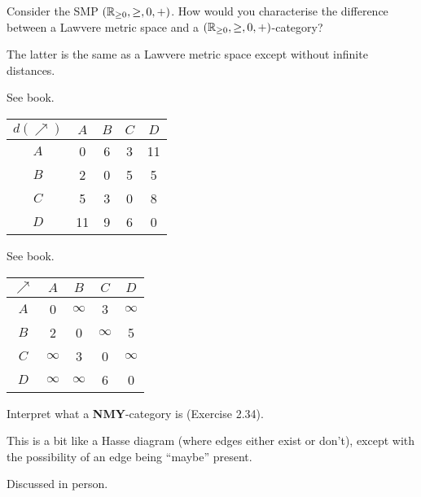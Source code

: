Consider the SMP $(\mathbb{R}_{\geq0},\geq,0,+)$.  How would you characterise the difference between a Lawvere metric space and a $(\mathbb{R}_{\geq0},\geq,0,+)$-category?

\solution
The latter is the same as a Lawvere metric space except without infinite distances.

See book.

\solution
\begin{tabular}{c|cccc}
$d(\nearrow)$ & $A$ & $B$ & $C$ & $D$ \\
\hline$A$ & 0 & 6 & 3 & 11 \\
$B$ & 2 & 0 & 5 & 5 \\
$C$ & 5 & 3 & 0 & 8 \\
$D$ & 11 & 9 & 6 & 0
\end{tabular}

See book.

\solution
\begin{tabular}{c|cccc}
$\nearrow$ & $A$ & $B$ & $C$ & $D$ \\
\hline$A$ & 0 & $\infty$ & 3 & $\infty$ \\
$B$ & 2 & 0 & $\infty$ & 5 \\
$C$ & $\infty$ & 3 & 0 & $\infty$ \\
$D$ & $\infty$ & $\infty$ & 6 & 0
\end{tabular}

Interpret what a \textbf{NMY}-category is (Exercise 2.34).

\solution
This is a bit like a Hasse diagram (where edges either exist or don't), except with the possibility of an edge being ``maybe'' present.

Discussed in person.


